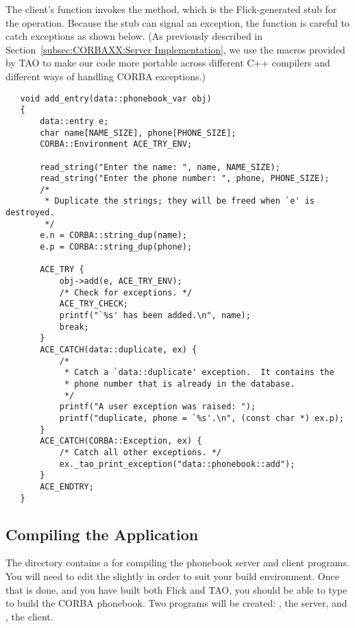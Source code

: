 The client's  function invokes the
 method, which is the Flick-generated stub for
the  operation.  Because the stub can signal an exception, the
 function is careful to catch exceptions as shown below.
(As previously described in Section~\ref{subsec:CORBAXX:Server Implementation},
we use the  macros provided by TAO to make our code more
portable across different C++ compilers and different ways of handling CORBA
exceptions.)

\begin{verbatim}
   void add_entry(data::phonebook_var obj)
   {
       data::entry e;
       char name[NAME_SIZE], phone[PHONE_SIZE];
       CORBA::Environment ACE_TRY_ENV;

       read_string("Enter the name: ", name, NAME_SIZE);
       read_string("Enter the phone number: ", phone, PHONE_SIZE);
       /*
        * Duplicate the strings; they will be freed when `e' is destroyed.
        */
       e.n = CORBA::string_dup(name);
       e.p = CORBA::string_dup(phone);

       ACE_TRY {
           obj->add(e, ACE_TRY_ENV);
           /* Check for exceptions. */
           ACE_TRY_CHECK;
           printf("`%s' has been added.\n", name);
           break;
       }
       ACE_CATCH(data::duplicate, ex) {
           /*
            * Catch a `data::duplicate' exception.  It contains the
            * phone number that is already in the database.
            */
           printf("A user exception was raised: ");
           printf("duplicate, phone = `%s'.\n", (const char *) ex.p);
       }
       ACE_CATCH(CORBA::Exception, ex) {
           /* Catch all other exceptions. */
           ex._tao_print_exception("data::phonebook::add");
       }
       ACE_ENDTRY;
   }
\end{verbatim}



\subsection{Compiling the Application}
\label{subsec:CORBAXX:Compiling the Application}

The  directory contains a
 for compiling the phonebook server and client programs.
You will need to edit the  slightly in order to suit your
build environment.  Once that is done, and you have built both Flick and TAO,
you should be able to type  to build the CORBA phonebook.  Two
programs will be created: , the server, and
, the client.

